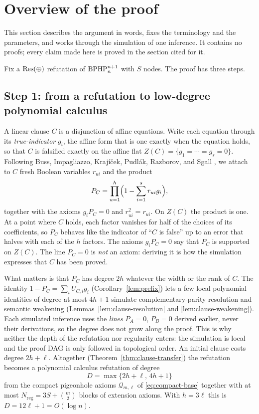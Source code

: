 \section{Overview of the proof}\label{sec:overview}

This section describes the argument in words, fixes the terminology and the
parameters, and works through the simulation of one inference. It contains no
proofs; every claim made here is proved in the section cited for it.

Fix a \(\mathrm{Res}(\oplus)\) refutation of \(\mathrm{BPHP}^{n+1}_n\) with \(S\) nodes. The proof
has three steps.

\subsection{Step 1: from a refutation to low-degree polynomial calculus}
A linear clause \(C\) is a disjunction of affine equations. Write each
equation through its \emph{true-indicator} \(g_i\), the affine form that is
one exactly when the equation holds, so that \(C\) is falsified exactly on
the affine flat \(Z(C)=\{g_1=\cdots=g_s=0\}\). Following Buss, Impagliazzo,
Kraj\'i\v{c}ek, Pudl\'ak, Razborov, and Sgall \cite{BIKPRS}, we attach to
\(C\) fresh Boolean variables \(r_{ui}\) and the product
\[
 P_C=\prod_{u=1}^{h}\Bigl(1-\sum_{i=1}^{s}r_{ui}g_i\Bigr),
\]
together with the axioms \(g_iP_C=0\) and \(r_{ui}^2=r_{ui}\). On \(Z(C)\)
the product is one. At a point where \(C\) holds, each factor vanishes for
half of the choices of its coefficients, so \(P_C\) behaves like the
indicator of ``\(C\) is false'' up to an error that halves with each of the
\(h\) factors. The axioms \(g_iP_C=0\) say that \(P_C\) is supported on
\(Z(C)\). The line \(P_C=0\) is \emph{not} an axiom: deriving it is how the
simulation expresses that \(C\) has been proved.

What matters is that \(P_C\) has degree \(2h\) whatever the width or the
rank of \(C\). The identity \(1-P_C=\sum_iU_{C,i}g_i\)
(Corollary~\ref{lem:prefix}) lets a few local polynomial identities of
degree at most \(4h+1\) simulate complementary-parity resolution and
semantic weakening (Lemmas~\ref{lem:clause-resolution} and
\ref{lem:clause-weakening}). Each simulated inference uses the \emph{lines}
\(P_A=0\), \(P_B=0\) derived earlier, never their derivations, so the
degree does not grow along the proof. This is why neither the depth of
the refutation nor regularity enters: the simulation is local and the
proof DAG is only followed in topological order. An initial clause costs
degree \(2h+\ell\). Altogether (Theorem~\ref{thm:clause-transfer}) the
refutation becomes a polynomial calculus refutation of degree
\[
 D=\max\{2h+\ell,\,4h+1\}
\]
from the compact pigeonhole axioms \(\mathcal Q_{m,\ell}\) of
\eqref{eq:compact-base} together with at most
\(N_{\mathrm{reg}}=3S+\binom m2\) blocks of extension axioms. With
\(h=3\ell\) this is \(D=12\ell+1=O(\log n)\).


